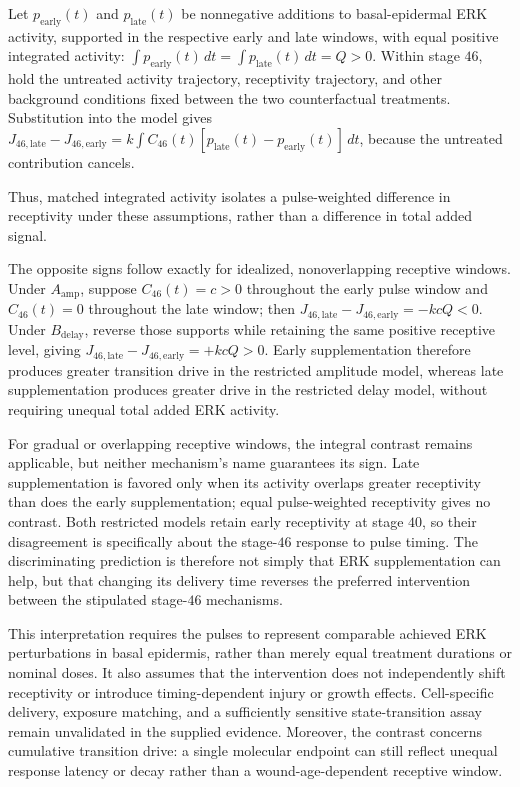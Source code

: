 \documentclass[11pt]{article}
\begin{document}
Let $p_{\mathrm{early}}(t)$ and $p_{\mathrm{late}}(t)$ be nonnegative additions to basal-epidermal ERK activity, supported in the respective early and late windows, with equal positive integrated activity: $\int p_{\mathrm{early}}(t)\,dt=\int p_{\mathrm{late}}(t)\,dt=Q>0$. Within stage $46$, hold the untreated activity trajectory, receptivity trajectory, and other background conditions fixed between the two counterfactual treatments. Substitution into the model gives $J_{46,\mathrm{late}}-J_{46,\mathrm{early}}=k\int C_{46}(t)[p_{\mathrm{late}}(t)-p_{\mathrm{early}}(t)]\,dt$, because the untreated contribution cancels.

Thus, matched integrated activity isolates a pulse-weighted difference in receptivity under these assumptions, rather than a difference in total added signal.

The opposite signs follow exactly for idealized, nonoverlapping receptive windows. Under $A_{\mathrm{amp}}$, suppose $C_{46}(t)=c>0$ throughout the early pulse window and $C_{46}(t)=0$ throughout the late window; then $J_{46,\mathrm{late}}-J_{46,\mathrm{early}}=-kcQ<0$. Under $B_{\mathrm{delay}}$, reverse those supports while retaining the same positive receptive level, giving $J_{46,\mathrm{late}}-J_{46,\mathrm{early}}=+kcQ>0$. Early supplementation therefore produces greater transition drive in the restricted amplitude model, whereas late supplementation produces greater drive in the restricted delay model, without requiring unequal total added ERK activity.

For gradual or overlapping receptive windows, the integral contrast remains applicable, but neither mechanism's name guarantees its sign. Late supplementation is favored only when its activity overlaps greater receptivity than does the early supplementation; equal pulse-weighted receptivity gives no contrast. Both restricted models retain early receptivity at stage $40$, so their disagreement is specifically about the stage-$46$ response to pulse timing. The discriminating prediction is therefore not simply that ERK supplementation can help, but that changing its delivery time reverses the preferred intervention between the stipulated stage-$46$ mechanisms.

This interpretation requires the pulses to represent comparable achieved ERK perturbations in basal epidermis, rather than merely equal treatment durations or nominal doses. It also assumes that the intervention does not independently shift receptivity or introduce timing-dependent injury or growth effects. Cell-specific delivery, exposure matching, and a sufficiently sensitive state-transition assay remain unvalidated in the supplied evidence. Moreover, the contrast concerns cumulative transition drive: a single molecular endpoint can still reflect unequal response latency or decay rather than a wound-age-dependent receptive window.
\end{document}
